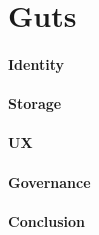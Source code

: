 
\section{Guts}

\paragraph{Identity}


\paragraph{Storage}


\paragraph{UX}


\paragraph{Governance}

\paragraph{Conclusion}